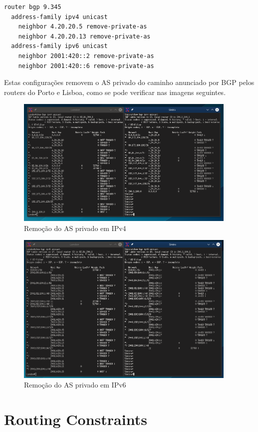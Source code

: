\documentclass[11pt,a4paper]{report}
\begin{document}
\begin{lstlisting}[caption=Remoção do AS privado - Router Lisboa]
router bgp 9.345
  address-family ipv4 unicast
    neighbor 4.20.20.5 remove-private-as
    neighbor 4.20.20.13 remove-private-as
  address-family ipv6 unicast
  	neighbor 2001:420::2 remove-private-as
  	neighbor 2001:420::6 remove-private-as
\end{lstlisting}

Estas configurações removem o AS privado do caminho anunciado por BGP pelos routers do Porto e Lisboa, como se pode verificar nas imagens seguintes.

\begin{figure}[H]
\centerline{\includegraphics[width=300pt]{private_as_removal_ipv4.png}}
\caption{Remoção do AS privado em IPv4}
\label{schema}
\end{figure}

\begin{figure}[H]
\centerline{\includegraphics[width=300pt]{private_as_removal_ipv6.png}}
\caption{Remoção do AS privado em IPv6}
\label{schema}
\end{figure}


\section{Routing Constraints}
\end{document}
